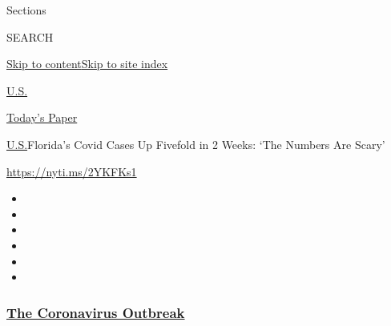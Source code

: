 Sections

SEARCH

\protect\hyperlink{site-content}{Skip to
content}\protect\hyperlink{site-index}{Skip to site index}

\href{https://www.nytimes3xbfgragh.onion/section/us}{U.S.}

\href{https://myaccount.nytimes3xbfgragh.onion/auth/login?response_type=cookie\&client_id=vi}{}

\href{https://www.nytimes3xbfgragh.onion/section/todayspaper}{Today's
Paper}

\href{/section/us}{U.S.}\textbar{}Florida's Covid Cases Up Fivefold in 2
Weeks: `The Numbers Are Scary'

\url{https://nyti.ms/2YKFKs1}

\begin{itemize}
\item
\item
\item
\item
\item
\item
\end{itemize}

\hypertarget{the-coronavirus-outbreak}{%
\subsubsection{\texorpdfstring{\href{https://www.nytimes3xbfgragh.onion/news-event/coronavirus?name=styln-coronavirus-national\&region=TOP_BANNER\&variant=undefined\&block=storyline_menu_recirc\&action=click\&pgtype=Article\&impression_id=3e6b8210-e385-11ea-85cc-bf105b368d22}{The
Coronavirus
Outbreak}}{The Coronavirus Outbreak}}\label{the-coronavirus-outbreak}}

